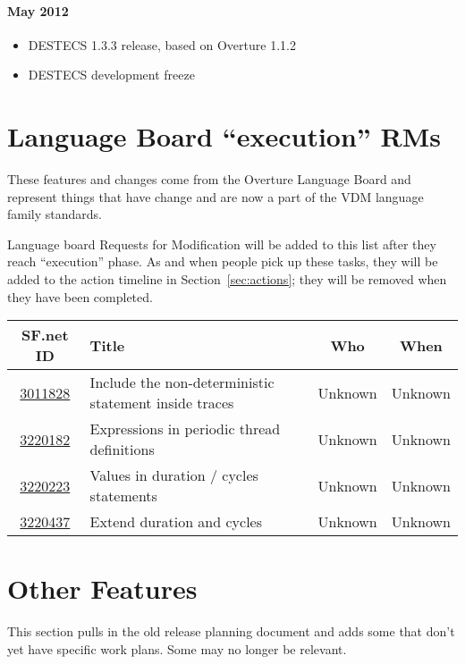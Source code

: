 \documentclass{overturerep}
\newenvironment{denseitemize}
  {\begin{itemize}\setlength{\itemsep}{0pt}\setlength{\parskip}{0pt}\setlength{\parsep}{0pt}}
  {\end{itemize}}
\newcommand{\developer}[1]{{\scriptsize \fbox{#1}}}
\begin{document}
\paragraph{May 2012} 
\begin{denseitemize}
\item DESTECS 1.3.3 release, based on Overture 1.1.2 \developer{ARI}
\item DESTECS development freeze
\end{denseitemize}


\section{Language Board ``execution'' RMs}

  These features and changes come from the Overture Language Board and
  represent things that have change and are now a part of the VDM
  language family standards.

  Language board Requests for Modification will be added to this list
  after they reach ``execution'' phase.  As and when people pick up
  these tasks, they will be added to the action timeline in
  Section~\ref{sec:actions}; they will be removed when they have been
  completed.

\begin{tabular}{clcc}
SF.net ID & Title & Who & When \\
\hline
\href{https://sourceforge.net/tracker/?func=detail&aid=3011828&group_id=141350&atid=1127184}{3011828}
	& Include the non-deterministic statement inside traces
	& Unknown & Unknown \\
\href{https://sourceforge.net/tracker/?func=detail&aid=3220182&group_id=141350&atid=1127184}{3220182}
	& Expressions in periodic thread definitions
	& Unknown & Unknown \\
\href{https://sourceforge.net/tracker/?func=detail&aid=3220223&group_id=141350&atid=1127184}{3220223}
	& Values in duration / cycles statements	
	& Unknown & Unknown \\
\href{https://sourceforge.net/tracker/?func=detail&aid=3220437&group_id=141350&atid=1127184}{3220437}
	& Extend duration and cycles	
	& Unknown & Unknown
\end{tabular}



\section{Other Features}
This section pulls in the old release planning document and adds some
that don't yet have specific work plans.  Some may no longer be
relevant.
\end{document}
